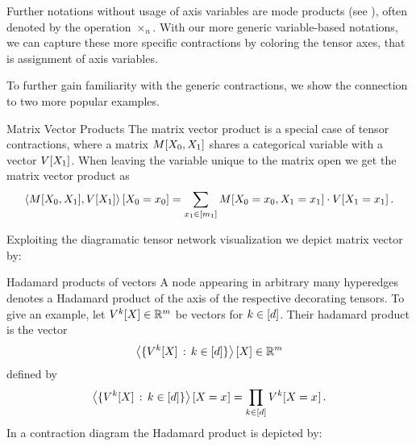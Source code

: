 Further notations without usage of axis variables are mode products (see \cite{kolda_tensor_2009,hackbusch_tensor_2012,cichocki_tensor_2015}), often denoted by the operation $\times_n$.
With our more generic variable-based notations, we can capture these more specific contractions by coloring the tensor axes, that is assignment of axis variables.

To further gain familiarity with the generic contractions, we show the connection to two more popular examples.

\begin{example}{Matrix Vector Products}\label{exa:matrixProduct}
	The matrix vector product is a special case of tensor contractions, where a matrix $M[X_{0},X_{1}]$ shares a categorical variable with a vector $V[X_{1}]$.
	When leaving the variable unique to the matrix open we get the matrix vector product as
		\[ \left\langle M[X_{0},X_{1}],V[X_{1}]\right\rangle \left[ X_{0}=x_{0} \right] = \sum_{x_{1}\in[m_{1}]} M[X_{0}=x_{0},X_{1}=x_{1}] \cdot V[X_{1}=x_{1}] \, .  \]

	Exploiting the diagramatic tensor network visualization we depict matrix vector by: %
	\begin{center}
		
	\end{center}
\end{example}

\begin{example}{Hadamard products of vectors}\label{exa:hadamard}
	A node appearing in arbitrary many hyperedges denotes a Hadamard product of the axis of the respective decorating tensors.
	To give an example, let $V^{k}[X]\in\mathbb{R}^m$ be vectors for $k\in[d]$. Their hadamard product is the vector
		\[ \left\langle \{V^{k}[X] \,:\, k\in[d]\}\right\rangle \left[ X \right]  \in \mathbb{R}^m \]
	defined by
		\[ \left\langle \{V^{k}[X] \,:\, k\in[d]\}\right\rangle \left[ X_{}=x_{} \right]
		= \prod_{k\in[d]} V^{k}[X_{}=x_{}]\, . \]
	In a contraction diagram the Hadamard product is depicted by: %
	\begin{center}
		
	\end{center}
\end{example}



